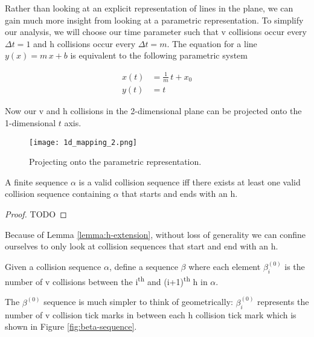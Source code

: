 
Rather than looking at an explicit representation of lines in the plane, we can gain much more insight from looking at a parametric representation. To simplify our analysis, we will choose our time parameter such that v collisions occur every $\Delta t = 1$ and h collisions occur every $\Delta t = m$. The equation for a line $y(x) = m \, x + b$ is equivalent to the following parametric system

\begin{align}\label{eq:parametric-line}
	x(t)& = \frac{1}{m} \, t + x_0\\
	y(t)& = t
\end{align}

Now our v and h collisions in the 2-dimensional plane can be projected onto the 1-dimensional $t$ axis.

\begin{figure}[H]
  \begin{center}
    \texttt{[image: 1d\_mapping\_2.png]}
  \end{center}
  \vspace{-.2in} %
  \caption{\label{fig:1d-projection} Projecting onto the parametric representation.}
\end{figure}

\begin{lemma}\label{lemma:h-extension}
	A finite sequence $\alpha$ is a valid collision sequence iff there exists at least one valid collision sequence containing $\alpha$ that starts and ends with an h.
\end{lemma}

\begin{proof}
	TODO
\end{proof}

Because of Lemma \ref{lemma:h-extension}, without loss of generality we can confine ourselves to only look at collision sequences that start and end with an h.

\begin{definition}
	Given a collision sequence $\alpha$, define a sequence $\beta$ where each element $\beta^{(0)}_i$ is the number of v collisions between the i\textsuperscript{th} and (i+1)\textsuperscript{th} h in $\alpha$.
\end{definition}

The $\beta^{(0)}$ sequence is much simpler to think of geometrically: $\beta^{(0)}_i$ represents the number of v collision tick marks in between each h collision tick mark which is shown in Figure \ref{fig:beta-sequence}.

